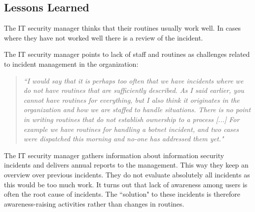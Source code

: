\subsection{Lessons Learned}
The IT security manager thinks that their routines usually work well. In cases where they have not worked well there is a review of the incident.


The IT security manager points to lack of staff and routines as challenges related to incident management in the organization: 

\begin{quote}
\textit{``I would say that it is perhaps too often that we have incidents where we do not have routines that are sufficiently described. %
As I said earlier, you cannot have routines for everything, but I also think it originates in the organization and how we are staffed to handle situations. There is no point in writing routines that do not establish ownership to a process [...] For example we have routines for handling a botnet incident, and two cases were dispatched this morning and no-one has addressed them yet."}
\end{quote}

The IT security manager gathers information about information security incidents and delivers annual reports to the management. This way they keep an overview over previous incidents. They do not evaluate absolutely all incidents as this would be too much work. It turns out that lack of awareness among users is often the root cause of incidents. The ``solution" to these incidents is therefore awareness-raising activities rather than changes in routines.

